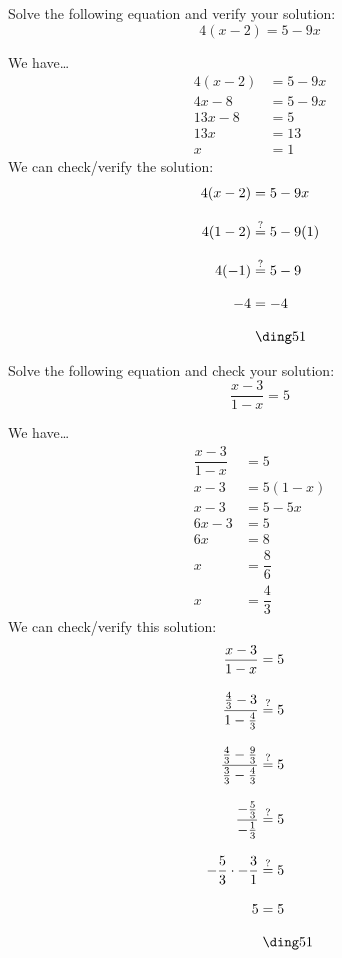 \documentclass[11pt,letterpaper]{article}
\begin{document}

 Solve the following equation and verify your solution:
	\[
	4(x - 2)= 5 - 9x
	\] \pspace

\sol We have\dots
	\[
	\begin{aligned}
	4(x - 2)&= 5 - 9x \\[0.3cm]
	4x - 8&= 5 - 9x \\[0.3cm]
	13x - 8&= 5 \\[0.3cm]
	13x&= 13 \\[0.3cm]
	x&= 1
	\end{aligned}
	\] 
We can check/verify the solution:
	\[
	\begin{aligned}
	4(x - 2)&= 5 - 9x \\[0.3cm]
	4(1 - 2)&\stackrel{?}{=} 5 - 9(1) \\[0.3cm]
	4(-1)&\stackrel{?}{=} 5 - 9 \\[0.3cm]
	-4&= -4 \\[0.3cm]
	&\;\text{\cmark}
	\end{aligned}
	\]



\newpage



 Solve the following equation and check your solution:
	\[
	\dfrac{x - 3}{1 - x}= 5
	\] \pspace

\sol We have\dots
	\[
	\begin{aligned}
	\dfrac{x - 3}{1 - x}&= 5 \\[0.3cm]
	x - 3&= 5(1 - x) \\[0.3cm]
	x - 3&= 5 - 5x \\[0.3cm]
	6x - 3&= 5 \\[0.3cm]
	6x&= 8 \\[0.3cm]
	x&= \dfrac{8}{6} \\[0.3cm]
	x&= \dfrac{4}{3}
	\end{aligned}
	\] 
We can check/verify this solution:
	\[
	\begin{aligned}
	\dfrac{x - 3}{1 - x}&= 5 \\[0.3cm]
	\dfrac{\frac{4}{3} - 3}{1 - \frac{4}{3}}&\stackrel{?}{=} 5 \\[0.3cm]
	\dfrac{\frac{4}{3} - \frac{9}{3}}{\frac{3}{3} - \frac{4}{3}}&\stackrel{?}{=} 5 \\[0.3cm]
	\dfrac{-\frac{5}{3}}{-\frac{1}{3}}&\stackrel{?}{=} 5 \\[0.3cm]
	-\dfrac{5}{3} \cdot -\dfrac{3}{1}&\stackrel{?}{=} 5 \\[0.3cm]
	5&= 5 \\[0.3cm]
	&\;\text{\cmark}
	\end{aligned}
	\] 
\end{document}

